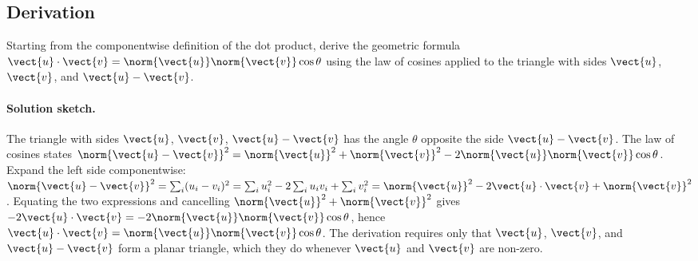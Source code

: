 \subsection*{Derivation}

\begin{exercise}
Starting from the componentwise definition of the dot product, derive
the geometric formula $\vect{u} \cdot \vect{v} = \norm{\vect{u}}
\norm{\vect{v}} \cos\theta$ using the law of cosines applied to the
triangle with sides $\vect{u}$, $\vect{v}$, and $\vect{u} - \vect{v}$.

\paragraph{Solution sketch.} The triangle with sides $\vect{u}$,
$\vect{v}$, $\vect{u} - \vect{v}$ has the angle $\theta$ opposite the
side $\vect{u} - \vect{v}$. The law of cosines states $\norm{\vect{u}
- \vect{v}}^{2} = \norm{\vect{u}}^{2} + \norm{\vect{v}}^{2} - 2
\norm{\vect{u}}\norm{\vect{v}}\cos\theta$. Expand the left side
componentwise: $\norm{\vect{u} - \vect{v}}^{2} = \sum_{i}(u_{i} -
v_{i})^{2} = \sum_{i} u_{i}^{2} - 2\sum_{i} u_{i} v_{i} + \sum_{i}
v_{i}^{2} = \norm{\vect{u}}^{2} - 2 \vect{u}\cdot\vect{v} +
\norm{\vect{v}}^{2}$. Equating the two expressions and cancelling
$\norm{\vect{u}}^{2} + \norm{\vect{v}}^{2}$ gives $-2 \vect{u}\cdot
\vect{v} = -2 \norm{\vect{u}}\norm{\vect{v}}\cos\theta$, hence
$\vect{u}\cdot\vect{v} = \norm{\vect{u}}\norm{\vect{v}}\cos\theta$.
The derivation requires only that $\vect{u}$, $\vect{v}$, and
$\vect{u} - \vect{v}$ form a planar triangle, which they do whenever
$\vect{u}$ and $\vect{v}$ are non-zero.
\end{exercise}

